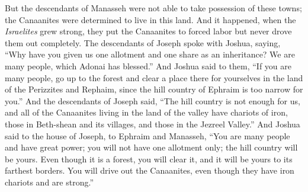 \begin{biblechapter}
\verse But the descendants of Manasseh were not able to take possession of these towns; the Canaanites were determined to live in this land.
\verse And it happened, when the \textit{Israelites} grew strong, they put the Canaanites to forced labor but never drove them out completely.
 The descendants of Joseph spoke with Joshua, saying, “Why have you given us one allotment and one share as an inheritance? We are many people, which Adonai has blessed.”
\verse And Joshua said to them, “If you are many people, go up to the forest and clear a place there for yourselves in the land of the Perizzites and Rephaim, since the hill country of Ephraim is too narrow for you.”
\verse And the descendants of Joseph said, “The hill country is not enough for us, and all of the Canaanites living in the land of the valley have chariots of iron, those in Beth-shean and its villages, and those in the Jezreel Valley.”
\verse And Joshua said to the house of Joseph, to Ephraim and Manasseh, “You are many people and have great power; you will not have one allotment only;
\verse the hill country will be yours. Even though it is a forest, you will clear it, and it will be yours to its farthest borders. You will drive out the Canaanites, even though they have iron chariots and are strong.”
\end{biblechapter}

